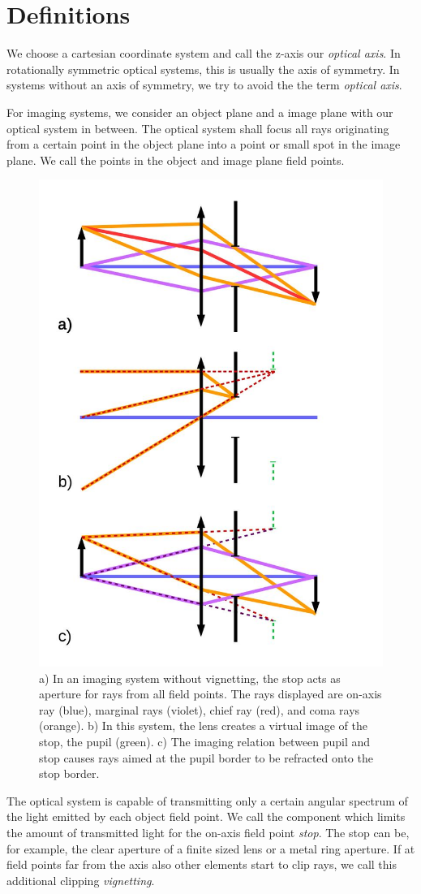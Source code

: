 \documentclass[12pt,a4paper,twoside,openright,BCOR10mm,headsepline,titlepage,abstracton,chapterprefix,final]{scrreprt}
\begin{document}
\section{Definitions}

We choose a cartesian coordinate system and call the z-axis our \emph{optical axis}. 
In rotationally symmetric optical systems, this is usually the axis of symmetry.
In systems without an axis of symmetry, we try to avoid the the term \emph{optical axis}.

For imaging systems, we consider an object plane and a image plane with our optical system in between. 
The optical system shall focus all rays originating from a certain point in the object plane into a point or small spot in the image plane.
We call the points in the object and image plane field points.

\begin{figure}
  \centering
   \includegraphics[width=0.5\columnwidth]{pupil}
  \caption{a) In an imaging system without vignetting, the stop acts as aperture for rays from all field points. The rays displayed are on-axis ray (blue), marginal rays (violet), chief ray (red), and coma rays (orange).
  b) In this system, the lens creates a virtual image of the stop, the pupil (green).
  c) The imaging relation between pupil and stop causes rays aimed at the pupil border to be refracted onto the stop border.
  }
  \label{fig:pupil}
\end{figure}

The optical system is capable of transmitting only a certain angular spectrum of the light emitted by each object field point.
We call the component which limits the amount of transmitted light for the on-axis field point \emph{stop}.
The stop can be, for example, the clear aperture of a finite sized lens or a metal ring aperture.
If at field points far from the axis also other elements start to clip rays, we call this additional clipping \emph{vignetting}.
\end{document}
